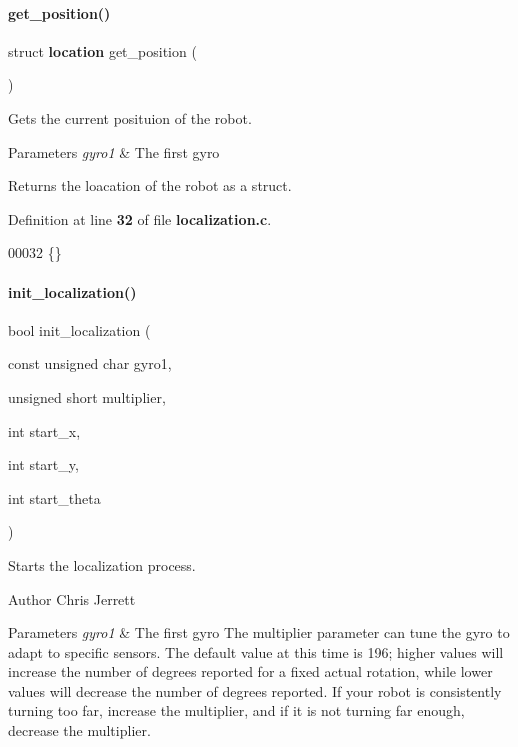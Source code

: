 \paragraph{get\+\_\+position()}
{\footnotesize\ttfamily struct \textbf{ location} get\+\_\+position (\begin{DoxyParamCaption}{ }\end{DoxyParamCaption})}



Gets the current posituion of the robot. 


\begin{DoxyParams}{Parameters}
{\em gyro1} & The first gyro \\
\hline
\end{DoxyParams}
\begin{DoxyReturn}{Returns}
the loacation of the robot as a struct. 
\end{DoxyReturn}


Definition at line \textbf{ 32} of file \textbf{ localization.\+c}.


\begin{DoxyCode}
00032 \{\}
\end{DoxyCode}
\mbox{\label{a00119_afdd0147de6aa15957e9a125f9cd20578}} 
\paragraph{init\+\_\+localization()}
{\footnotesize\ttfamily bool init\+\_\+localization (\begin{DoxyParamCaption}\item[{const unsigned char}]{gyro1,  }\item[{unsigned short}]{multiplier,  }\item[{int}]{start\+\_\+x,  }\item[{int}]{start\+\_\+y,  }\item[{int}]{start\+\_\+theta }\end{DoxyParamCaption})}



Starts the localization process. 

\begin{DoxyAuthor}{Author}
Chris Jerrett
\end{DoxyAuthor}

\begin{DoxyParams}{Parameters}
{\em gyro1} & The first gyro  The multiplier parameter can tune the gyro to adapt to specific sensors. The default value at this time is 196; higher values will increase the number of degrees reported for a fixed actual rotation, while lower values will decrease the number of degrees reported. If your robot is consistently turning too far, increase the multiplier, and if it is not turning far enough, decrease the multiplier. \\
\hline
\end{DoxyParams}



